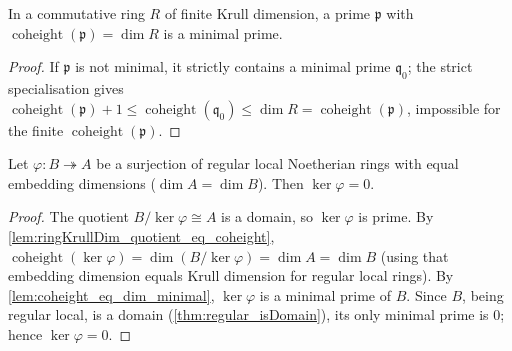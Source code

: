 \begin{lemma}
  \label{lem:coheight_eq_dim_minimal}
  \leanok
  In a commutative ring \(R\) of finite Krull dimension, a prime \(\mathfrak p\)
  with \(\operatorname{coheight}(\mathfrak p) = \dim R\) is a minimal prime.
\end{lemma}
\begin{proof}
  \leanok
  If \(\mathfrak p\) is not minimal, it strictly contains a minimal prime
  \(\mathfrak q_0\); the strict specialisation gives
  \(\operatorname{coheight}(\mathfrak p) + 1 \le \operatorname{coheight}(\mathfrak q_0)
  \le \dim R = \operatorname{coheight}(\mathfrak p)\), impossible for the finite
  \(\operatorname{coheight}(\mathfrak p)\).
\end{proof}

\begin{lemma}
  \label{lem:ker_eq_bot_equal_dim}
  \leanok
  Let \(\varphi : B \twoheadrightarrow A\) be a surjection of regular local
  Noetherian rings with equal embedding dimensions
  (\(\dim A = \dim B\)). Then \(\ker \varphi = 0\).
\end{lemma}
\begin{proof}
  \leanok
  The quotient \(B/\ker\varphi \cong A\) is a domain, so \(\ker\varphi\) is
  prime. By \ref{lem:ringKrullDim_quotient_eq_coheight},
  \(\operatorname{coheight}(\ker\varphi) = \dim(B/\ker\varphi) = \dim A = \dim B\)
  (using that embedding dimension equals Krull dimension for regular local
  rings). By \ref{lem:coheight_eq_dim_minimal}, \(\ker\varphi\) is a minimal
  prime of \(B\). Since \(B\), being regular local, is a domain
  (\ref{thm:regular_isDomain}), its only minimal prime is \(0\); hence
  \(\ker\varphi = 0\).
\end{proof}

